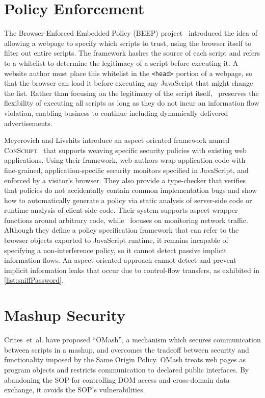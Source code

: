 \section{Policy Enforcement}

The Browser-Enforced Embedded Policy (BEEP) project~\cite{jim.etal+07} introduced the idea of allowing a webpage to specify which scripts to trust, using the browser itself to filter out entire scripts.
The framework hashes the source of each script and refers to a whitelist to determine the legitimacy of a script before executing it.
A website author must place this whitelist in the \texttt{<head>} portion of a webpage, so that the browser can load it before executing any JavaScript that might change the list.
Rather than focusing on the legitimacy of the script itself, \FlowCore\ preserves the flexibility of executing all scripts as long as they do not incur an information flow violation, enabling business to continue including dynamically delivered advertisements.

Meyerovich and Livshits introduce an aspect oriented framework named \textsc{ConScript}~\cite{meyerovich.livshits+10} that supports weaving specific security policies with existing web applications.
Using their framework, web authors wrap application code with fine-grained, application-specific security monitors specified in JavaScript, and enforced by a visitor's browser.
They also provide a type-checker that verifies that policies do not accidentally contain common implementation bugs and show how to automatically generate a policy via static analysis of server-side code or runtime analysis of client-side code.
Their system supports aspect wrapper functions around arbitrary code, while \FlowCore\ focuses on monitoring network traffic.
Although they define a policy specification framework that can refer to the browser objects exported to JavaScript runtime, it remains incapable of specifying a non-interference policy, so it cannot detect passive implicit information flows.
An aspect oriented approach cannot detect and prevent implicit information leaks that occur due to control-flow transfers, as exhibited in \autoref{list:sniffPassword}.

\section{Mashup Security}

Crites~et~al.\cite{crites.etal+08} have proposed ``OMash'', a mechanism which secures communication between scripts in a mashup, and overcomes the tradeoff between security and functionality imposed by the Same Origin Policy.
OMash treats web pages as program objects and restricts communication to declared public interfaces.
By abandoning the SOP for controlling DOM access and cross-domain data exchange, it avoids the SOP's vulnerabilities.

